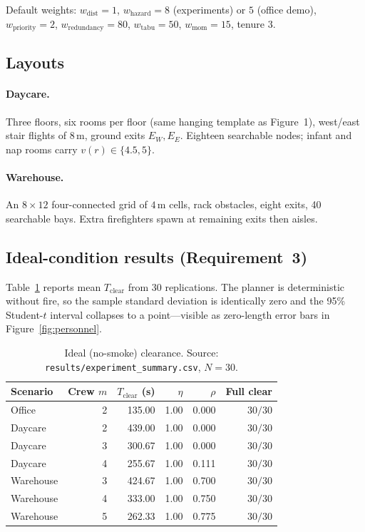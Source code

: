 \documentclass[12pt]{article}
\newcommand{\Tclear}{T_{\mathrm{clear}}}
\begin{document}
Default weights:
\(w_{\mathrm{dist}}=1\), \(w_{\mathrm{hazard}}=8\) (experiments) or \(5\) (office demo),
\(w_{\mathrm{priority}}=2\), \(w_{\mathrm{redundancy}}=80\),
\(w_{\mathrm{tabu}}=50\), \(w_{\mathrm{mom}}=15\), tenure \(3\).

\subsection{Layouts}

\paragraph{Daycare.}
Three floors, six rooms per floor (same hanging template as Figure~1), west/east
stair flights of \(8\,\mathrm{m}\), ground exits \(E_W,E_E\). Eighteen searchable
nodes; infant and nap rooms carry \(v(r)\in\{4.5,5\}\).

\paragraph{Warehouse.}
An \(8\times 12\) four-connected grid of \(4\,\mathrm{m}\) cells, rack obstacles,
eight exits, 40 searchable bays. Extra firefighters spawn at remaining exits then
aisles.

\subsection{Ideal-condition results (Requirement~3)}

Table~\ref{tab:clear} reports mean \(\Tclear\) from 30 replications. The planner is
deterministic without fire, so the sample standard deviation is identically zero and
the 95\% Student-\(t\) interval collapses to a point---visible as zero-length error
bars in Figure~\ref{fig:personnel}.

\begin{table}[htbp]
\centering
\caption{Ideal (no-smoke) clearance. Source:
\texttt{results/experiment\_summary.csv}, \(N=30\).}
\label{tab:clear}
\begin{tabular}{@{}lrrrrr@{}}
\toprule
Scenario & Crew \(m\) & \(\Tclear\) (s) & \(\eta\) & \(\rho\) & Full clear \\
\midrule
Office     & 2 & 135.00 & 1.00 & 0.000 & \(30/30\) \\
Daycare    & 2 & 439.00 & 1.00 & 0.000 & \(30/30\) \\
Daycare    & 3 & 300.67 & 1.00 & 0.000 & \(30/30\) \\
Daycare    & 4 & 255.67 & 1.00 & 0.111 & \(30/30\) \\
Warehouse  & 3 & 424.67 & 1.00 & 0.700 & \(30/30\) \\
Warehouse  & 4 & 333.00 & 1.00 & 0.750 & \(30/30\) \\
Warehouse  & 5 & 262.33 & 1.00 & 0.775 & \(30/30\) \\
\bottomrule
\end{tabular}
\end{table}
\end{document}
